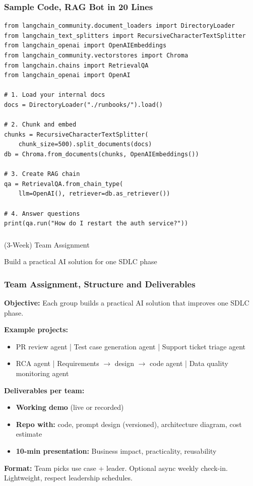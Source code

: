 \begin{frame}[fragile]\frametitle{Sample Code, RAG Bot in 20 Lines}
\begin{lstlisting}
from langchain_community.document_loaders import DirectoryLoader
from langchain_text_splitters import RecursiveCharacterTextSplitter
from langchain_openai import OpenAIEmbeddings
from langchain_community.vectorstores import Chroma
from langchain.chains import RetrievalQA
from langchain_openai import OpenAI

# 1. Load your internal docs
docs = DirectoryLoader("./runbooks/").load()

# 2. Chunk and embed
chunks = RecursiveCharacterTextSplitter(
    chunk_size=500).split_documents(docs)
db = Chroma.from_documents(chunks, OpenAIEmbeddings())

# 3. Create RAG chain
qa = RetrievalQA.from_chain_type(
    llm=OpenAI(), retriever=db.as_retriever())

# 4. Answer questions
print(qa.run("How do I restart the auth service?"))
\end{lstlisting}
\end{frame}


\begin{frame}[fragile]\frametitle{}
\begin{center}
{\Large (3-Week) Team Assignment}

{\small Build a practical AI solution for one SDLC phase}
\end{center}
\end{frame}

\begin{frame}[fragile]\frametitle{Team Assignment, Structure and Deliverables}
\textbf{Objective:} Each group builds a practical AI solution that improves one SDLC phase.

\textbf{Example projects:}
\begin{itemize}
\item PR review agent | Test case generation agent | Support ticket triage agent
\item RCA agent | Requirements $\rightarrow$ design $\rightarrow$ code agent | Data quality monitoring agent
\end{itemize}

\textbf{Deliverables per team:}
\begin{itemize}
\item \textbf{Working demo} (live or recorded)
\item \textbf{Repo with:} code, prompt design (versioned), architecture diagram, cost estimate
\item \textbf{10-min presentation:} Business impact, practicality, reusability
\end{itemize}

\textbf{Format:} Team picks use case + leader. Optional async weekly check-in. Lightweight, respect leadership schedules.
\end{frame}


